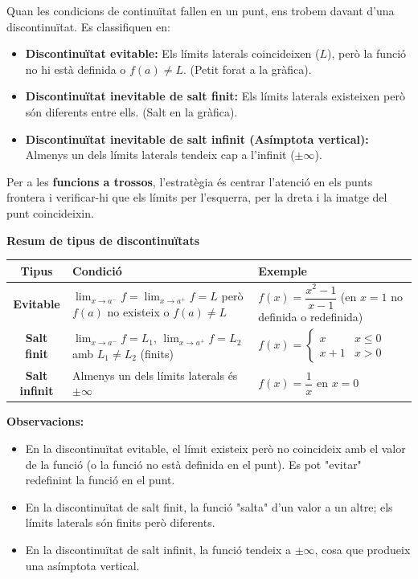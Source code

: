 \documentclass[12pt]{article}
\begin{document}
\begin{concept}
Quan les condicions de continuïtat fallen en un punt, ens trobem davant d'una discontinuïtat. Es classifiquen en:
\begin{itemize}
    \item \textbf{Discontinuïtat evitable:} Els límits laterals coincideixen ($L$), però la funció no hi està definida o $f(a) \neq L$. (Petit forat a la gràfica).
    \item \textbf{Discontinuïtat inevitable de salt finit:} Els límits laterals existeixen però són diferents entre ells. (Salt en la gràfica).
    \item \textbf{Discontinuïtat inevitable de salt infinit (Asímptota vertical):} Almenys un dels límits laterals tendeix cap a l'infinit ($\pm \infty$).
\end{itemize}

Per a les \textbf{funcions a trossos}, l'estratègia és centrar l'atenció en els punts frontera i verificar-hi que els límits per l'esquerra, per la dreta i la imatge del punt coincideixin.
\end{concept}

\begin{concept}
\textbf{Resum de tipus de discontinuïtats}

\begin{center}
\small
\renewcommand{\arraystretch}{1.4}
\begin{tabular}{|c|p{4.2cm}|p{4.2cm}|}
\hline
\textbf{Tipus} & \textbf{Condició} & \textbf{Exemple} \\
\hline
\textbf{Evitable} & 
$\displaystyle\lim_{x\to a^-}f=\lim_{x\to a^+}f=L$ però $f(a)$ no existeix o $f(a)\neq L$ &
$f(x)=\dfrac{x^2-1}{x-1}$ (en $x=1$ no definida o redefinida) \\[0.3cm]
\hline
\textbf{Salt finit} & 
$\displaystyle\lim_{x\to a^-}f=L_1$, $\displaystyle\lim_{x\to a^+}f=L_2$ amb $L_1\neq L_2$ (finits) &
$f(x)=\begin{cases}x & x\leq 0 \\ x+1 & x>0 \end{cases}$ \\[0.3cm]
\hline
\textbf{Salt infinit} & 
Almenys un dels límits laterals és $\pm\infty$ &
$f(x)=\dfrac{1}{x}$ en $x=0$ \\[0.3cm]
\hline
\end{tabular}
\normalsize
\end{center}

\textbf{Observacions:}
\begin{itemize}
    \item En la discontinuïtat evitable, el límit existeix però no coincideix amb el valor de la funció (o la funció no està definida en el punt). Es pot "evitar" redefinint la funció en el punt.
    \item En la discontinuïtat de salt finit, la funció "salta" d'un valor a un altre; els límits laterals són finits però diferents.
    \item En la discontinuïtat de salt infinit, la funció tendeix a $\pm\infty$, cosa que produeix una asímptota vertical.
\end{itemize}
\end{concept}
\end{document}
